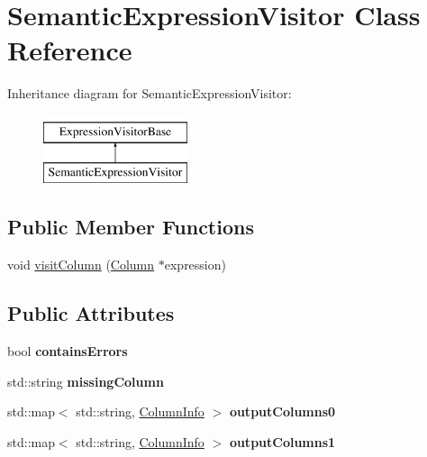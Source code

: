 \hypertarget{class_semantic_expression_visitor}{\section{Semantic\+Expression\+Visitor Class Reference}
\label{class_semantic_expression_visitor}
}
Inheritance diagram for Semantic\+Expression\+Visitor\+:\begin{figure}[H]
\begin{center}
\leavevmode
\includegraphics[height=2.000000cm]{class_semantic_expression_visitor}
\end{center}
\end{figure}
\subsection*{Public Member Functions}
\begin{DoxyCompactItemize}
\item 
void \hyperlink{class_semantic_expression_visitor_a5a669aa8f4ff78ca0bfd3aab0a4d11d9}{visit\+Column} (\hyperlink{class_column}{Column} $\ast$expression)
\end{DoxyCompactItemize}
\subsection*{Public Attributes}
\begin{DoxyCompactItemize}
\item 
\hypertarget{class_semantic_expression_visitor_a5355c2bd3477b4d33bc7ab5443408d11}{bool {\bfseries contains\+Errors}}\label{class_semantic_expression_visitor_a5355c2bd3477b4d33bc7ab5443408d11}

\item 
\hypertarget{class_semantic_expression_visitor_a2082ef4052d1c35fdda7bcc72c5bb132}{std\+::string {\bfseries missing\+Column}}\label{class_semantic_expression_visitor_a2082ef4052d1c35fdda7bcc72c5bb132}

\item 
\hypertarget{class_semantic_expression_visitor_a38fc36443e4cabad8039ac58f9934780}{std\+::map$<$ std\+::string, \hyperlink{class_column_info}{Column\+Info} $>$ {\bfseries output\+Columns0}}\label{class_semantic_expression_visitor_a38fc36443e4cabad8039ac58f9934780}

\item 
\hypertarget{class_semantic_expression_visitor_aca4d42fbadc6310390ccdbe65a0356fd}{std\+::map$<$ std\+::string, \hyperlink{class_column_info}{Column\+Info} $>$ {\bfseries output\+Columns1}}\label{class_semantic_expression_visitor_aca4d42fbadc6310390ccdbe65a0356fd}

\end{DoxyCompactItemize}


